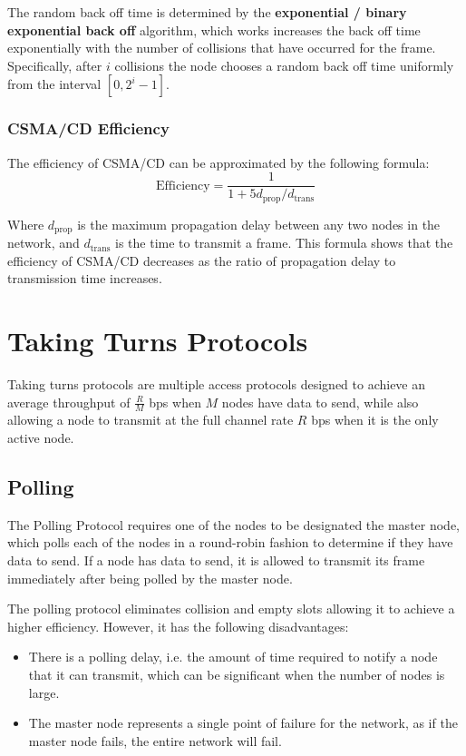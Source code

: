 \documentclass[12pt letter]{report}
\begin{document}
The random back off time is determined by the \textbf{exponential /
binary exponential back off} algorithm, which works increases the
back off time exponentially with the number of collisions that have
occurred for the frame. Specifically, after $i$ collisions the node
chooses a random back off time uniformly from the interval $[0, 2^i - 1]$.

\subsubsection{CSMA/CD Efficiency}

The efficiency of CSMA/CD can be approximated by the following formula:
\[
  \text{Efficiency} = \frac{1}{1 + 5d_{\text{prop}} / d_{\text{trans}}}
\]

Where $d_{\text{prop}}$ is the maximum propagation delay between any
two nodes in the network, and $d_{\text{trans}}$ is the time to
transmit a frame. This formula shows that the efficiency of CSMA/CD
decreases as the ratio of propagation delay to transmission time increases.

\section{Taking Turns Protocols}

Taking turns protocols are multiple access protocols designed to
achieve an average throughput of $\frac{R}{M}$ bps when $M$ nodes
have data to send, while also allowing a node to transmit at the full
channel rate $R$ bps when it is the only active node.

\subsection{Polling}

The Polling Protocol requires one of the nodes to be designated the
master node, which polls each of the nodes in a round-robin fashion
to determine if they have data to send. If a node has data to send,
it is allowed to transmit its frame immediately after being polled by
the master node.

The polling protocol eliminates collision and empty slots allowing it
to achieve a higher efficiency. However, it has the following disadvantages:
\begin{itemize}
  \item There is a polling delay, i.e. the amount of time required to
    notify a node that it can transmit, which can be significant when
    the number of nodes is large.
  \item The master node represents a single point of failure for the
    network, as if the master node fails, the entire network will fail.
\end{itemize}
\end{document}
